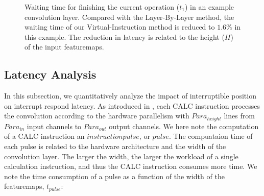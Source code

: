 \begin{figure}[t]
	\centering
	\label{fig:t1example}
	\caption{ Waiting time for finishing the current operation ($t_1$) in an example convolution layer. Compared with the Layer-By-Layer method, the waiting time of our Virtual-Instruction method is reduced to $1.6\%$ in this example. The reduction in latency is related to the height ($H$) of the input featuremaps.  }
\end{figure}



\subsection {Latency Analysis}

In this subsection, we quantitatively analyze the impact of interruptible position on interrupt respond latency. 
As introduced in , each CALC  instruction processes the convolution according to the hardware parallelism with $Para_{height}$ lines from $ Para_{in} $ input channels to $ Para_{out}$ output channels. 
We here note the computation of a CALC instruction an $instruction pulse$, or $pulse$.
The compuataion time of each pulse is related to the hardware architecture and the width of the convolution layer. The larger the width, the larger the workload of a single calculation instruction, and thus the CALC instruction consumes more time. We note the time consumption of a pulse as a function of the width of the featuremaps, $t_{pulse}$:

